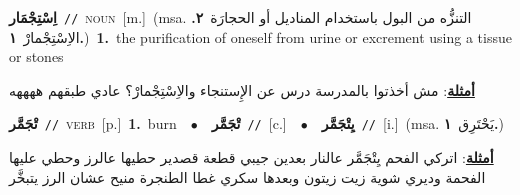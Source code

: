 \documentclass[10pt,a4paper,twoside]{article} %
\begin{document}
\begin{multicols}{2}
{\setlength\topsep{0pt}\textbf{\foreignlanguage{arabic}{اِسْتِجْمَار}}\ {\color{gray}\texttt{//}\color{black}}\ \textsc{noun}\ [m.]\ \color{gray}(msa. \foreignlanguage{arabic}{التنزُّه من البول باستخدام المناديل أو الحجارَة}~\foreignlanguage{arabic}{\textbf{٢.}}  \foreignlanguage{arabic}{الاِسْتِجْمارْ}~\foreignlanguage{arabic}{\textbf{١.}})\color{black}\ \textbf{1.}~the purification of oneself from urine or excrement using a tissue or stones\  \begin{flushright}\color{gray}\foreignlanguage{arabic}{\textbf{\underline{\foreignlanguage{arabic}{أمثلة}}}: مش أخذتوا بالمدرسة درس عن الإِستنجاء والاِسْتِجْمارْ؟ عادي طبقهم ههههه}\end{flushright}\color{black}} \vspace{2mm}

{\setlength\topsep{0pt}\textbf{\foreignlanguage{arabic}{تْجَمَّر}}\ {\color{gray}\texttt{//}\color{black}}\ \textsc{verb}\ [p.]\ \textbf{1.}~burn\ \ $\bullet$\ \ \setlength\topsep{0pt}\textbf{\foreignlanguage{arabic}{تْجَمَّر}}\ {\color{gray}\texttt{//}\color{black}}\ [c.]\ \ $\bullet$\ \ \setlength\topsep{0pt}\textbf{\foreignlanguage{arabic}{يِتْجَمَّر}}\ {\color{gray}\texttt{//}\color{black}}\ [i.]\ \color{gray}(msa. \foreignlanguage{arabic}{يَحْتَرِق}~\foreignlanguage{arabic}{\textbf{١.}})\color{black}\  \begin{flushright}\color{gray}\foreignlanguage{arabic}{\textbf{\underline{\foreignlanguage{arabic}{أمثلة}}}: اتركي الفحم يِتْجَمَّر عالنار بعدين جيبي قطعة قصدير حطيها عالرز وحطي عليها الفحمة وديري شوية زيت زيتون وبعدها سكري غطا الطنجرة منيح عشان الرز يتبخَّر}\end{flushright}\color{black}} \vspace{2mm}


\end{multicols}
\end{document}

